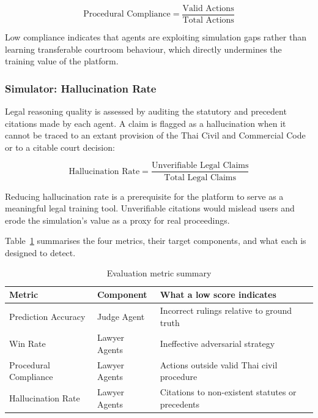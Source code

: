 \[
\text{Procedural Compliance} = \frac{\text{Valid Actions}}{\text{Total Actions}}
\]

Low compliance indicates that agents are exploiting simulation gaps rather than learning transferable courtroom behaviour, which directly undermines the training value of the platform.

\subsubsection{Simulator: Hallucination Rate}

Legal reasoning quality is assessed by auditing the statutory and precedent citations made by each agent. A claim is flagged as a hallucination when it cannot be traced to an extant provision of the Thai Civil and Commercial Code or to a citable court decision:

\[
\text{Hallucination Rate} = \frac{\text{Unverifiable Legal Claims}}{\text{Total Legal Claims}}
\]

Reducing hallucination rate is a prerequisite for the platform to serve as a meaningful legal training tool. Unverifiable citations would mislead users and erode the simulation's value as a proxy for real proceedings.

\bigskip
\noindent Table~\ref{tab:eval-summary} summarises the four metrics, their target components, and what each is designed to detect.

\begin{table}[htbp]
\centering
\caption{Evaluation metric summary}
\label{tab:eval-summary}
\begin{tabular}{llp{6cm}}
\hline
\textbf{Metric} & \textbf{Component} & \textbf{What a low score indicates} \\
\hline
Prediction Accuracy       & Judge Agent  & Incorrect rulings relative to ground truth \\
Win Rate                  & Lawyer Agents & Ineffective adversarial strategy \\
Procedural Compliance     & Lawyer Agents & Actions outside valid Thai civil procedure \\
Hallucination Rate        & Lawyer Agents & Citations to non-existent statutes or precedents \\
\hline
\end{tabular}
\end{table}
